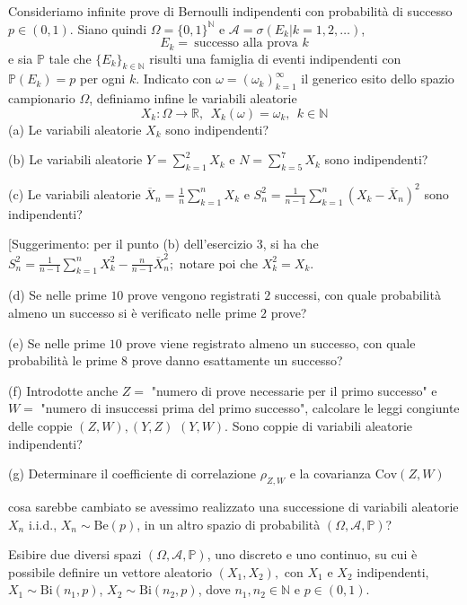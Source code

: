Consideriamo infinite prove di Bernoulli indipendenti con probabilità di successo $p\in (0,1)$. Siano quindi $\Omega =\{0,1\}^{\mathbb{N}}$ e $\mathcal{A} =\sigma ( E_{k} |k=1,2,\dotsc )$,
\begin{equation*}
E_{k} =\ \text{successo alla prova } k
\end{equation*}
e sia $\mathbb{P}$ tale che $\{E_{k}\}_{k\in \mathbb{N}}$ risulti una famiglia di eventi indipendenti con $\mathbb{P}( E_{k}) =p$ per ogni $k$. Indicato con $\omega =( \omega _{k})_{k=1}^{\infty }$ il generico esito dello spazio campionario $\Omega $, definiamo infine le variabili aleatorie
\begin{equation*}
X_{k} :\Omega \rightarrow \mathbb{R} ,\ \ X_{k} (\omega )=\omega _{k} ,\ \ k\in \mathbb{N}
\end{equation*}
(a) Le variabili aleatorie $X_{k}$ sono indipendenti?

(b) Le variabili aleatorie $Y=\sum _{k=1}^{2} X_{k}$ e $N=\sum _{k=5}^{7} X_{k}$ sono indipendenti?

(c) Le variabili aleatorie $\overline{X}_{n} =\frac{1}{n}\sum _{k=1}^{n} X_{k}$ e $S_{n}^{2} =\frac{1}{n-1}\sum _{k=1}^{n}( X_{k} -\overline{X}_{n})^{2}$ sono indipendenti?

[Suggerimento: per il punto (b) dell'esercizio 3, si ha che $S_{n}^{2} =\frac{1}{n-1}\sum _{k=1}^{n} X_{k}^{2} -\frac{n}{n-1}\overline{X}_{n}^{2} ;$ notare poi che $X_{k}^{2} =X_{k}$.

(d) Se nelle prime $10$ prove vengono registrati $2$ successi, con quale probabilità almeno un successo si è verificato nelle prime $2$ prove?

(e) Se nelle prime $10$ prove viene registrato almeno un successo, con quale probabilità le prime $8$ prove danno esattamente un successo?

(f) Introdotte anche $Z=$ "numero di prove necessarie per il primo successo" e $W=$ "numero di insuccessi prima del primo successo", calcolare le leggi congiunte delle coppie $(Z,W),(Y,Z)$ $(Y,W).$ Sono coppie di variabili aleatorie indipendenti?

(g) Determinare il coefficiente di correlazione $\rho _{Z,W}$ e la covarianza $\mathrm{Cov} (Z,W)$

cosa sarebbe cambiato se avessimo realizzato una successione di variabili aleatorie $X_{n}$ i.i.d., $X_{n} \sim \mathrm{Be} (p)$, in un altro spazio di probabilità $(\Omega ,\mathcal{A} ,\mathbb{P} )$?

Esibire due diversi spazi $(\Omega ,\mathcal{A} ,\mathbb{P} )$, uno discreto e uno continuo, su cui è possibile definire un vettore aleatorio $( X_{1} ,X_{2}) ,$ con $X_{1}$ e $X_{2}$ indipendenti, $X_{1} \sim \mathrm{Bi}( n_{1} ,p)$, $X_{2} \sim \mathrm{Bi}( n_{2} ,p)$, dove $n_{1} ,n_{2} \in \mathbb{N}$ e $p\in (0,1)$.

